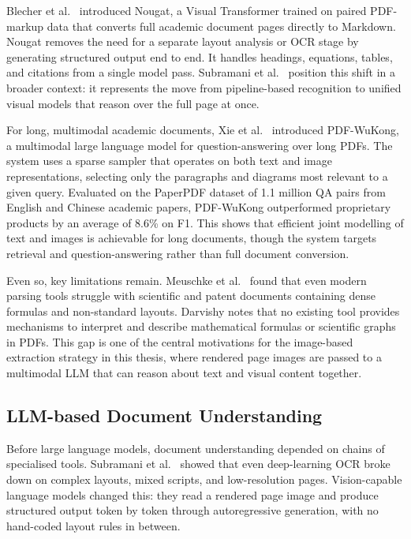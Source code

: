 \documentclass[12pt]{article}
\begin{document}
Blecher et al.\ \cite{blecher2023} introduced Nougat, a Visual Transformer
trained on paired PDF-markup data that converts full academic document pages
directly to Markdown. Nougat removes the need for a separate layout analysis
or OCR stage by generating structured output end to end. It handles headings,
equations, tables, and citations from a single model pass. Subramani et al.\
\cite{subramani2020} position this shift in a broader context: it represents
the move from pipeline-based recognition to unified visual models that reason
over the full page at once.

For long, multimodal academic documents, Xie et al.\ \cite{wukong2024} introduced
PDF-WuKong, a multimodal large language model for question-answering over long
PDFs. The system uses a sparse sampler that operates on both text and image
representations, selecting only the paragraphs and diagrams most relevant to a
given query. Evaluated on the PaperPDF dataset of 1.1 million QA pairs from
English and Chinese academic papers, PDF-WuKong outperformed proprietary products
by an average of 8.6\% on F1. This shows that efficient joint modelling of text
and images is achievable for long documents, though the system targets retrieval
and question-answering rather than full document conversion.

Even so, key limitations remain. Meuschke et al.\ \cite{meuschke2023} found
that even modern parsing tools struggle with scientific and patent documents
containing dense formulas and non-standard layouts.
Darvishy \cite{darvishy2018} notes that no existing tool provides mechanisms to
interpret and describe mathematical formulas or scientific graphs in PDFs. This gap
is one of the central motivations for the image-based extraction strategy in this
thesis, where rendered page images are passed to a multimodal LLM that can reason
about text and visual content together.

\subsection{LLM-based Document Understanding}

Before large language models, document understanding depended on chains of
specialised tools. Subramani et al.\ \cite{subramani2020} showed that even
deep-learning OCR broke down on complex layouts, mixed scripts, and
low-resolution pages. Vision-capable language models changed this: they read a
rendered page image and produce structured output token by token through
autoregressive generation, with no hand-coded layout rules in between.
\end{document}
